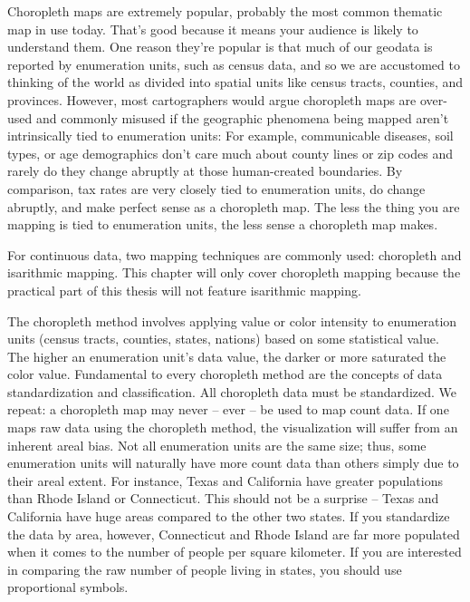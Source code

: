 Choropleth maps are extremely popular, probably the most common thematic map in use today. That's good because it means your audience is likely to understand them. One reason they're popular is that much of our geodata is reported by enumeration units, such as census data, and so we are accustomed to thinking of the world as divided into spatial units like census tracts, counties, and provinces. However, most cartographers would argue choropleth maps are over-used and commonly misused if the geographic phenomena being mapped aren't intrinsically tied to enumeration units: For example, communicable diseases, soil types, or age demographics don't care much about county lines or zip codes and rarely do they change abruptly at those human-created boundaries. By comparison, tax rates are very closely tied to enumeration units, do change abruptly, and make perfect sense as a choropleth map. The less the thing you are mapping is tied to enumeration units, the less sense a choropleth map makes.




For continuous data, two mapping techniques are commonly used: choropleth and isarithmic mapping. This chapter will only cover choropleth mapping because the practical part of this thesis will not feature isarithmic mapping.


The choropleth method involves applying value or color
intensity to enumeration units (census tracts, counties, states, nations) based on some statistical
value. The higher an enumeration unit’s data value, the darker or more saturated the color value.
Fundamental to every choropleth method are the concepts of data standardization and
classification.
All choropleth data must be standardized. We repeat: a choropleth map may never – ever –
be used to map count data. If one maps raw data using the choropleth method, the visualization
will suffer from an inherent areal bias. Not all enumeration units are the same size; thus, some
enumeration units will naturally have more count data than others simply due to their areal
extent. For instance, Texas and California have greater populations than Rhode Island or
Connecticut. This should not be a surprise – Texas and California have huge areas compared to
the other two states. If you standardize the data by area, however, Connecticut and Rhode Island
are far more populated when it comes to the number of people per square kilometer. If you are
interested in comparing the raw number of people living in states, you should use proportional
symbols.